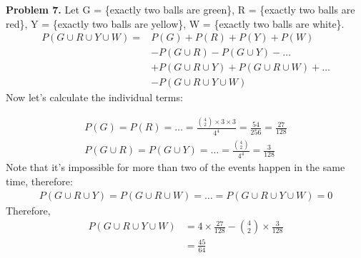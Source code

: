 \documentclass{article}
\begin{document}
\textbf{Problem 7.}
Let G = \{exactly two balls are green\}, R = \{exactly two balls are red\}, Y = \{exactly two balls are yellow\}, W = \{exactly two balls are white\}.
\begin{align}
    P(G \cup R \cup Y \cup W) = & P(G) + P(R) + P(Y) + P(W) \\
    & - P (G \cup R) - P(G \cup Y) -\dots \\
    & + P(G \cup R \cup Y) + P(G \cup R \cup W) + \dots \\
    & - P(G \cup R \cup Y \cup W)
\end{align}
Now let's calculate the individual terms:

\begin{align}
    P(G) = P(R) = \dots = \frac{{4 \choose 2} \times 3 \times 3}{4^4} = \frac{54}{256} = \frac{27}{128}\\
    P(G \cup R) = P(G \cup Y) = \dots = \frac{{4 \choose 2}}{4^4} = \frac{3 }{128}
\end{align}
Note that it's impossible for more than two of the events happen in the same time, therefore:
\begin{align}
    P(G \cup R \cup Y) = P(G \cup R \cup W) = \dots = P(G \cup R \cup Y \cup W) = 0
\end{align}
Therefore,
\begin{align}
    P(G \cup R \cup Y \cup W) & = 4 \times \frac{27}{128} - {4 \choose 2} \times \frac{3}{128} \\
    & = \frac{45}{64}
\end{align}
\bigbreak
\end{document}
